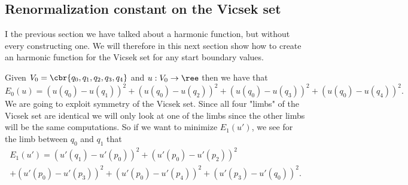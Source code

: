 \subsection{Renormalization constant on the Vicsek set}

I the previous section we have talked about a harmonic function, but without every constructing one. We will therefore in this next section show how to create an harmonic function for the Vicsek set for any start boundary values.

Given $V_0 = \cbr{q_0, q_1, q_2, q_3, q_4}$ and $u: V_0 \to \ree$ then we have that
\begin{equation}
	E_0(u) = \left(u(q_0) - u(q_1)\right)^2 + \left(u(q_0) - u(q_2)\right)^2 + \left(u(q_0) - u(q_3)\right)^2 + \left(u(q_0) - u(q_4)\right)^2.
\end{equation} 
We are going to exploit symmetry of the Vicsek set. Since all four "limbs" of the Vicsek set are identical we will only look at one of the limbs since the other limbs will be the same computations. So if we want to minimize $E_1(u')$, we see for the limb between $q_0$ and $q_1$ that
\begin{multline}
	E_1(u') = \left(u'(q_1) - u'(p_0)\right)^2 + \left(u'(p_0) - u'(p_2)\right)^2 \\
	 + \left(u'(p_0) - u'(p_3)\right)^2 + \left(u'(p_0) - u'(p_4)\right)^2 + \left(u'(p_3) - u'(q_0)\right)^2.
\end{multline}


